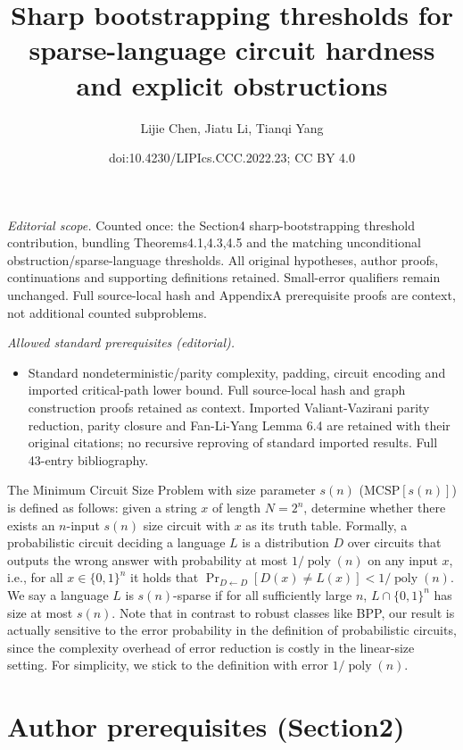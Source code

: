 \documentclass[10pt,a4paper]{article}
\title{Sharp bootstrapping thresholds for sparse-language circuit hardness and explicit obstructions}
\author{Lijie Chen, Jiatu Li, Tianqi Yang}
\date{doi:10.4230/LIPIcs.CCC.2022.23; CC BY 4.0}
\begin{document}
\maketitle
\noindent\textit{Editorial scope.} Counted once: the Section4 sharp-bootstrapping threshold contribution, bundling Theorems4.1,4.3,4.5 and the matching unconditional obstruction/sparse-language thresholds. All original hypotheses, author proofs, continuations and supporting definitions retained. Small-error qualifiers remain unchanged. Full source-local hash and AppendixA prerequisite proofs are context, not additional counted subproblems.\par\medskip
\noindent\textit{Allowed standard prerequisites (editorial).}\begin{itemize}
\item Standard nondeterministic/parity complexity, padding, circuit encoding and imported critical-path lower bound. Full source-local hash and graph construction proofs retained as context. Imported Valiant-Vazirani parity reduction, parity closure and Fan-Li-Yang Lemma 6.4 are retained with their original citations; no recursive reproving of standard imported results. Full 43-entry bibliography.
\end{itemize}\medskip
The Minimum Circuit Size Problem with size parameter $s(n)$ ($\mathrm{MCSP}[s(n)]$) is defined as follows: given a string $x$ of length $N=2^n$, determine whether there exists an $n$-input $s(n)$ size circuit with $x$ as its truth table.
Formally, a probabilistic circuit deciding a language $L$ is a distribution $D$ over circuits that outputs the wrong answer with probability at most $1/\operatorname{poly}(n)$ on any input $x$, i.e., for all $x\in\{0,1\}^n$ it holds that $\Pr_{D\leftarrow D}[D(x)\ne L(x)]<1/\operatorname{poly}(n)$. We say a language $L$ is $s(n)$-sparse if for all sufficiently large $n$, $L\cap\{0,1\}^n$ has size at most $s(n)$.
Note that in contrast to robust classes like BPP, our result is actually sensitive to the error probability in the definition of probabilistic circuits, since the complexity overhead of error reduction is costly in the linear-size setting. For simplicity, we stick to the definition with error $1/\operatorname{poly}(n)$.

\section*{Author prerequisites (Section2)}
\end{document}
